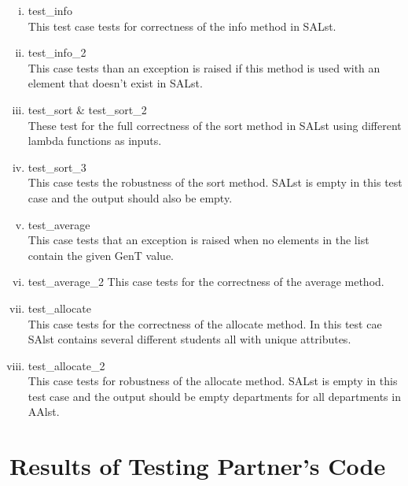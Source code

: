 \documentclass[12pt]{article}
\begin{document}
\begin{enumerate}[A.]
\begin{enumerate}[i)]
      \item test\_info\\ This test case tests for correctness of the info method in SALst.
      \item test\_info\_2\\ This case tests than an exception is raised if this method is used with an element that doesn't exist in SALst.
      \item test\_sort \& test\_sort\_2\\ These test for the full correctness of the sort method in SALst using different lambda functions as inputs.
      \item test\_sort\_3\\ This case tests the robustness of the sort method. SALst is empty in this test case and the output should also be empty.
      \item test\_average\\ This case tests that an exception is raised when no elements in the list contain the given GenT value.
      \item test\_average\_2 This case tests for the correctness of the average method.
      \item test\_allocate\\ This case tests for the correctness of the allocate method. In this test cae SAlst contains several different students all with unique attributes.
      \item test\_allocate\_2\\ This case tests for robustness of the allocate method. SALst is empty in this test case and the output should be empty departments for all departments in AAlst.
    \end{enumerate}
\end{enumerate}


\section{Results of Testing Partner's Code}
\end{document}
